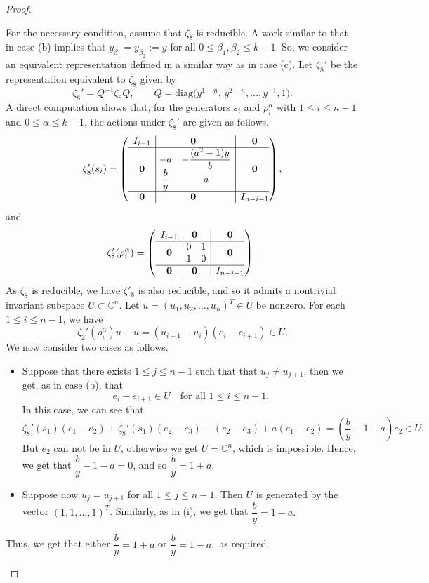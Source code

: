 \documentclass[preprint]{elsarticle}
\begin{document}
\begin{proof}
\begin{itemize}
For the necessary condition, assume that $\zeta_8$ is reducible. A work similar to that in case (b) implies that $y_{\beta_1} = y_{\beta_2} := y$ for all $0 \le \beta_1, \beta_2 \le k-1$. So, we consider an equivalent representation defined in a similar way as in case (c). Let $\zeta_8'$ be the representation equivalent to $\zeta_8$ given by
\[
\zeta_8'=Q^{-1}\zeta_8Q,
\qquad
Q=\mathrm{diag}\big(y^{1-n},\,y^{2-n},\ldots,y^{-1},1\big).
\]
A direct computation shows that, for the generators $s_i$ and $\rho_i^\alpha$
with $1 \le i \le n-1$ and $0 \le \alpha \le k-1$, the actions under $\zeta_8'$ are given as follows.
\[
\zeta_8'(s_i)=
\left(
\begin{array}{c|@{}c|c@{}}
\begin{matrix} I_{i-1} \end{matrix} & \mathbf{0} & \mathbf{0} \\
\hline
\mathbf{0} &
\begin{matrix}
\ -a & - \dfrac{(a^2-1)y}{b}\\
\ \dfrac{b}{y} & a
\end{matrix}
& \mathbf{0} \\
\hline
\mathbf{0} & \mathbf{0} & I_{n-i-1}
\end{array}
\right),
\]
and
\[
\zeta_8'(\rho_i^{\alpha})=
\left(
\begin{array}{c|@{}c|c@{}}
\begin{matrix} I_{i-1} \end{matrix} & \mathbf{0} & \mathbf{0} \\
\hline
\mathbf{0} &
\begin{matrix}
\ 0 & 1\\
\ 1 & 0
\end{matrix}
& \mathbf{0} \\
\hline
\mathbf{0} & \mathbf{0} & I_{n-i-1}
\end{array}
\right).
\]
As $\zeta_8$ is reducible, we have $\zeta'_8$ is also reducible, and so it admits a nontrivial invariant subspace
$U \subset \mathbb{C}^n$. Let $u=(u_1,u_2,\ldots,u_n)^T \in U$ be nonzero. For each $1 \le i \le n-1$, we have
\[
\zeta_2'(\rho_i^{\alpha})u - u
= (u_{i+1}-u_i)(e_i-e_{i+1}) \in U.
\]
We now consider two cases as follows.
\begin{itemize}
    \item[(i)] Suppose that there exists $1 \le j \le n-1$ such that that $u_j\neq u_{j+1}$, then we get, as in case (b), that
\[
e_i-e_{i+1} \in U \quad \text{for all } 1 \le i \le n-1.
\]
In this case, we can see that 
$$\zeta_8'(s_1)(e_1-e_2)+\zeta_8'(s_1)(e_2-e_3)-(e_2-e_3)+a(e_1-e_2)=\left( \dfrac{b}{y}-1-a \right)e_2\in U.$$
But $e_2$ can not be in $U$, otherwise we get $U=\mathbb{C}^n$, which is impossible. Hence, we get that $ \dfrac{b}{y}-1-a=0$, and so $ \dfrac{b}{y}=1+a$.
\item[(ii)] Suppose now $u_j= u_{j+1}$ for all $1\leq j\leq n-1$. Then $U$ is generated by the vector $(1,1,\ldots ,1)^T$. Similarly, as in (i), we get that $\dfrac{b}{y}=1-a.$
\end{itemize}
Thus, we get that either $ \dfrac{b}{y}=1+a$ or $\dfrac{b}{y}=1-a,$ as required.


\end{itemize}
\end{proof}
\end{document}
